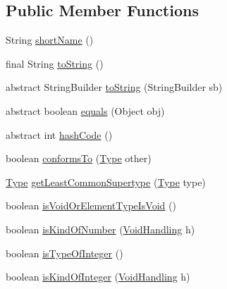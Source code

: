 \subsection*{Public Member Functions}
\begin{DoxyCompactItemize}
\item 
String \hyperlink{classorg_1_1tzi_1_1use_1_1uml_1_1ocl_1_1type_1_1_type_impl_a59b3d3d992ae074308fe8bd2862f303b}{short\-Name} ()
\item 
final String \hyperlink{classorg_1_1tzi_1_1use_1_1uml_1_1ocl_1_1type_1_1_type_impl_a36d68452942c6f779d8c2adaaaf700f8}{to\-String} ()
\item 
abstract String\-Builder \hyperlink{classorg_1_1tzi_1_1use_1_1uml_1_1ocl_1_1type_1_1_type_impl_a04a2e4f295270cf92d8652b84cf8e17e}{to\-String} (String\-Builder sb)
\item 
abstract boolean \hyperlink{classorg_1_1tzi_1_1use_1_1uml_1_1ocl_1_1type_1_1_type_impl_a9854e8e927b12646b3c1f9fdf395e9c0}{equals} (Object obj)
\item 
abstract int \hyperlink{classorg_1_1tzi_1_1use_1_1uml_1_1ocl_1_1type_1_1_type_impl_aafd9dc94fb3bf3985d6d1a33fc11ab0f}{hash\-Code} ()
\item 
boolean \hyperlink{classorg_1_1tzi_1_1use_1_1uml_1_1ocl_1_1type_1_1_type_impl_ad89cc7684c2c23156c3357a86128c19d}{conforms\-To} (\hyperlink{interfaceorg_1_1tzi_1_1use_1_1uml_1_1ocl_1_1type_1_1_type}{Type} other)
\item 
\hyperlink{interfaceorg_1_1tzi_1_1use_1_1uml_1_1ocl_1_1type_1_1_type}{Type} \hyperlink{classorg_1_1tzi_1_1use_1_1uml_1_1ocl_1_1type_1_1_type_impl_a0b84d9298ed484ac4170913beb2a28a7}{get\-Least\-Common\-Supertype} (\hyperlink{interfaceorg_1_1tzi_1_1use_1_1uml_1_1ocl_1_1type_1_1_type}{Type} type)
\item 
boolean \hyperlink{classorg_1_1tzi_1_1use_1_1uml_1_1ocl_1_1type_1_1_type_impl_a0381a4dbe6ce1e92fbdd83b596a25c9e}{is\-Void\-Or\-Element\-Type\-Is\-Void} ()
\item 
boolean \hyperlink{classorg_1_1tzi_1_1use_1_1uml_1_1ocl_1_1type_1_1_type_impl_a73140bb236937cea8b9202f031a7377a}{is\-Kind\-Of\-Number} (\hyperlink{enumorg_1_1tzi_1_1use_1_1uml_1_1ocl_1_1type_1_1_type_1_1_void_handling}{Void\-Handling} h)
\item 
boolean \hyperlink{classorg_1_1tzi_1_1use_1_1uml_1_1ocl_1_1type_1_1_type_impl_af352203fbae6cf7972ef065fd044a339}{is\-Type\-Of\-Integer} ()
\item 
boolean \hyperlink{classorg_1_1tzi_1_1use_1_1uml_1_1ocl_1_1type_1_1_type_impl_ac6795679e212976f5ece5892e30163ac}{is\-Kind\-Of\-Integer} (\hyperlink{enumorg_1_1tzi_1_1use_1_1uml_1_1ocl_1_1type_1_1_type_1_1_void_handling}{Void\-Handling} h)

\end{DoxyCompactItemize}
